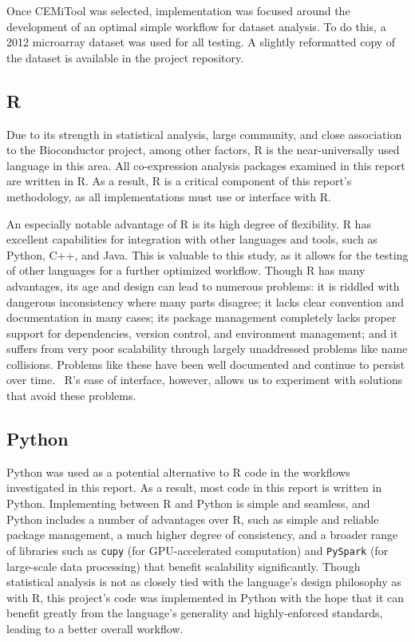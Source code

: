 Once CEMiTool was selected, implementation was focused around the development of an optimal simple workflow for dataset analysis. To do this, a 2012 microarray dataset \cite{dataset} was used for all testing. A slightly reformatted copy of the dataset is available in the project repository.

\subsection{R}
\label{subsec: R}
Due to its strength in statistical analysis, large community, and close association to the Bioconductor project, among other factors, R is the near-universally used language in this area. All co-expression analysis packages examined in this report are written in R. As a result, R is a critical component of this report's methodology, as all implementations must use or interface with R.

An especially notable advantage of R is its high degree of flexibility. R has excellent capabilities for integration with other languages and tools, such as Python, C++, and Java. This is valuable to this study, as it allows for the testing of other languages for a further optimized workflow. Though R has many advantages, its age and design can lead to numerous problems: it is riddled with dangerous inconsistency where many parts disagree; it lacks clear convention and documentation in many cases; its package management completely lacks proper support for dependencies, version control, and environment management; and it suffers from very poor scalability through largely unaddressed problems like name collisions. Problems like these have been well documented and continue to persist over time.~\cite{r_inferno}\cite{r_problems} R's ease of interface, however, allows us to experiment with solutions that avoid these problems.

\subsection{Python}
\label{subsec: python-intro}
Python was used as a potential alternative to R code in the workflows investigated in this report. As a result, most code in this report is written in Python. Implementing between R and Python is simple and seamless, and Python includes a number of advantages over R, such as simple and reliable package management, a much higher degree of consistency, and a broader range of libraries such as \texttt{cupy} (for GPU-accelerated computation) and \texttt{PySpark} (for large-scale data processing) that benefit scalability significantly. Though statistical analysis is not as closely tied with the language's design philosophy as with R, this project's code was implemented in Python with the hope that it can benefit greatly from the language's generality and highly-enforced standards, leading to a better overall workflow.

